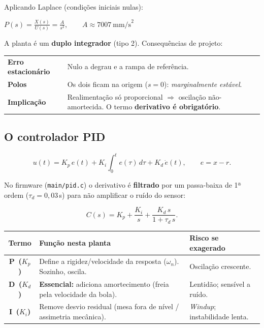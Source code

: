 \documentclass[11pt,a4paper,oneside]{article}
\newcommand{\rowstyle}{\rowcolor{rowgray}}
\begin{document}
Aplicando Laplace (condições iniciais nulas):

\begin{keybox}
$\displaystyle P(s) = \frac{X(s)}{U(s)} = \frac{A}{s^2}, \qquad A \approx 7007\ \text{mm/s}^2$
\end{keybox}

A planta é um \textbf{duplo integrador} (tipo 2). Consequências de projeto:

\begin{center}
\small
\begin{tabularx}{\textwidth}{>{\bfseries}l X}
\toprule
Erro estacionário & Nulo a degrau e a rampa de referência. \\
\rowstyle Polos & Os dois ficam na origem ($s=0$): \emph{marginalmente estável}. \\
Implicação & Realimentação só proporcional $\Rightarrow$ oscilação não-amortecida.
O termo \textbf{derivativo é obrigatório}. \\
\bottomrule
\end{tabularx}
\end{center}

\subsection{O controlador PID}

\begin{equation}
  u(t) = K_p\,e(t) + K_i\!\int_0^t\! e(\tau)\,d\tau + K_d\,\dot{e}(t),
  \qquad e = x - r .
\end{equation}

No firmware (\texttt{main/pid.c}) o derivativo é \textbf{filtrado} por um
passa-baixa de 1ª ordem ($\tau_d = 0{,}03$\,s) para não amplificar o ruído do
sensor:

\begin{equation}
  C(s) = K_p + \frac{K_i}{s} + \frac{K_d\,s}{1 + \tau_d\,s}.
\end{equation}

\begin{center}
\small
\renewcommand{\arraystretch}{1.2}
\begin{tabularx}{\textwidth}{>{\bfseries\color{primary}}c >{\RaggedRight}X >{\RaggedRight}X}
\toprule
Termo & \normalfont\bfseries Função nesta planta & \normalfont\bfseries Risco se exagerado \\
\midrule
P \,($K_p$) & Define a rigidez/velocidade da resposta ($\omega_n$). Sozinho, oscila. & Oscilação crescente. \\
\rowstyle D \,($K_d$) & \textbf{Essencial:} adiciona amortecimento (freia pela velocidade da bola). & Lentidão; sensível a ruído. \\
I \,($K_i$) & Remove desvio residual (mesa fora de nível / assimetria mecânica). & \emph{Windup}; instabilidade lenta. \\
\bottomrule
\end{tabularx}
\end{center}
\end{document}
